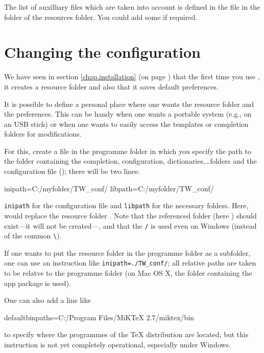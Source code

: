 The list of auxilliary files which are taken into account is defined in the file  in the  folder of the {\Tw} resources folder. You could add some if required.

\section{Changing the configuration}

We have seen in section \ref{chap.installation} (on page \pageref{chap.installation}) that the first time you use {\Tw}, it creates a resource folder and also that it saves default preferences.

It is possible to define a personal place where one wants the resource folder and the preferences. This can be handy when one wants a portable system (e.g., on an USB stick) or when one wants to easily access the templates or completion folders for modifications.

For this, create a file  in the programme folder in which you specify the path to the folder containing the completion, configuration, dictionaries,\dots folders and the configuration file (); there will be two lines:
\begin{verbExample}
inipath=C:/myfolder/TW_conf/
libpath=C:/myfolder/TW_conf/
\end{verbExample}

\verb+inipath+ for the configuration file and \verb+libpath+ for the necessary folders. Here,  would replace the resource folder . Note that the referenced folder (here ) should exist---it will not be created---, and that the \verb|/| is used even on Windows (instead of the common \verb+\+).

If one wants to put the resource folder in the programme folder as a subfolder, one can use an instruction like \verb+inipath=./TW_conf/+; all relative paths are taken to be relatve to the {\Tw} programme folder (on Mac OS X, the folder containing the app package is used).

One can also add a line like
\begin{verbExample}
defaultbinpaths=C:/Program Files/MiKTeX 2.7/miktex/bin
\end{verbExample}
to specify where the programmes of the {\TeX} distribution are located; but this instruction is not yet completely operational, especially under Windows.

